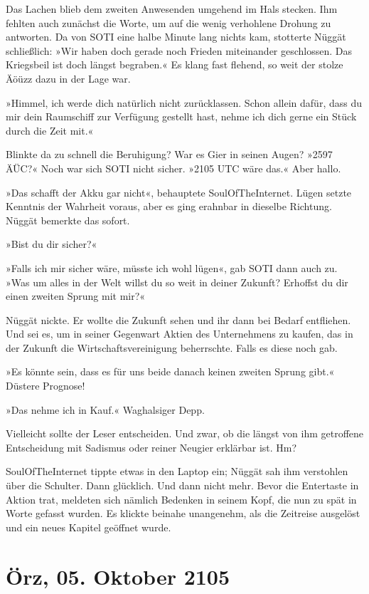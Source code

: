 Das Lachen blieb dem zweiten Anwesenden umgehend im Hals stecken. Ihm fehlten auch zunächst die Worte, um auf die wenig verhohlene Drohung zu antworten. Da von SOTI eine halbe Minute lang nichts kam, stotterte Nüggät schließlich: »Wir haben doch gerade noch Frieden miteinander geschlossen. Das Kriegsbeil ist doch längst begraben.« Es klang fast flehend, so weit der stolze Äöüzz dazu in der Lage war.

»Himmel, ich werde dich natürlich nicht zurücklassen. Schon allein dafür, dass du mir dein Raumschiff zur Verfügung gestellt hast, nehme ich dich gerne ein Stück durch die Zeit mit.«

Blinkte da zu schnell die Beruhigung? War es Gier in seinen Augen? »2597 ÄÜC?« Noch war sich SOTI nicht sicher. »2105 UTC wäre das.« Aber hallo.

»Das schafft der Akku gar nicht«, behauptete SoulOfTheInternet. Lügen setzte Kenntnis der Wahrheit voraus, aber es ging erahnbar in dieselbe Richtung. Nüggät bemerkte das sofort.

»Bist du dir sicher?«

»Falls ich mir sicher wäre, müsste ich wohl lügen«, gab SOTI dann auch zu. »Was um alles in der Welt willst du so weit in deiner Zukunft? Erhoffst du dir einen zweiten Sprung mit mir?«

Nüggät nickte. Er wollte die Zukunft sehen und ihr dann bei Bedarf entfliehen. Und sei es, um in seiner Gegenwart Aktien des Unternehmens zu kaufen, das in der Zukunft die Wirtschaftsvereinigung beherrschte. Falls es diese noch gab.

»Es könnte sein, dass es für uns beide danach keinen zweiten Sprung gibt.« Düstere Prognose!

»Das nehme ich in Kauf.« Waghalsiger Depp.

Vielleicht sollte der Leser entscheiden. Und zwar, ob die längst von ihm getroffene Entscheidung mit Sadismus oder reiner Neugier erklärbar ist. Hm?

SoulOfTheInternet tippte etwas in den Laptop ein; Nüggät sah ihm verstohlen über die Schulter. Dann glücklich. Und dann nicht mehr. Bevor die Entertaste in Aktion trat, meldeten sich nämlich Bedenken in seinem Kopf, die nun zu spät in Worte gefasst wurden. Es klickte beinahe unangenehm, als die Zeitreise ausgelöst und ein neues Kapitel geöffnet wurde.


\chapter{Örz, 05. Oktober 2105}

